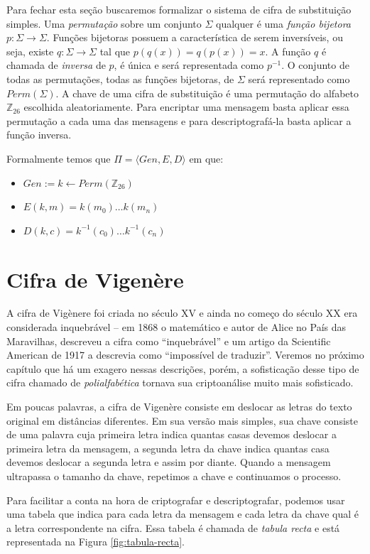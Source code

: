 Para fechar esta seção buscaremos formalizar o sistema de cifra de substituição simples.
Uma {\em permutação} sobre um conjunto $\Sigma$ qualquer é uma {\em função bijetora} $p: \Sigma \to \Sigma$.
Funções bijetoras possuem a característica de serem inversíveis, ou seja, existe $q: \Sigma \to \Sigma$ tal que $p(q(x)) = q(p(x)) = x$.
A função $q$ é chamada de {\em inversa} de $p$, é única e será representada como $p^{-1}$.
O conjunto de todas as permutações, todas as funções bijetoras, de $\Sigma$ será representado como $Perm(\Sigma)$.
A chave de uma cifra de substituição é uma permutação do alfabeto $\mathbb{Z}_{26}$ escolhida aleatoriamente.
Para encriptar uma mensagem basta aplicar essa permutação a cada uma das mensagens e para descriptografá-la basta aplicar a função inversa.

Formalmente temos que $\Pi = \langle Gen, E, D \rangle$ em que:
\begin{itemize}
\item $Gen := k \leftarrow Perm(\mathbb{Z}_{26})$
\item $E(k, m) = k(m_0) \dots k(m_n)$
\item $D(k, c) = k^{-1}(c_0) \dots k^{-1}(c_n)$
\end{itemize}

\section{Cifra de Vigenère}
\label{sec:cifra-de-vigenere}

A cifra de Vigènere foi criada no século XV e ainda no começo do século XX era considerada inquebrável -- em 1868 o matemático e autor de Alice no País das Maravilhas, descreveu a cifra como ``inquebrável'' e um artigo da Scientific American de 1917 a descrevia como ``impossível de traduzir''.
Veremos no próximo capítulo que há um exagero nessas descrições, porém, a sofisticação desse tipo de cifra chamado de {\em polialfabética} tornava sua criptoanálise muito mais sofisticado.

Em poucas palavras, a cifra de Vigenère consiste em deslocar as letras do texto original em distâncias diferentes.
Em sua versão mais simples, sua chave consiste de uma palavra cuja primeira letra indica quantas casas devemos deslocar a primeira letra da mensagem, a segunda letra da chave indica quantas casa devemos deslocar a segunda letra e assim por diante.
Quando a mensagem ultrapassa o tamanho da chave, repetimos a chave e continuamos o processo.

Para facilitar a conta na hora de criptografar e descriptografar, podemos usar uma tabela que indica para cada letra da mensagem e cada letra da chave qual é a letra correspondente na cifra.
Essa tabela é chamada de {\em tabula recta} e está representada na Figura \ref{fig:tabula-recta}.

